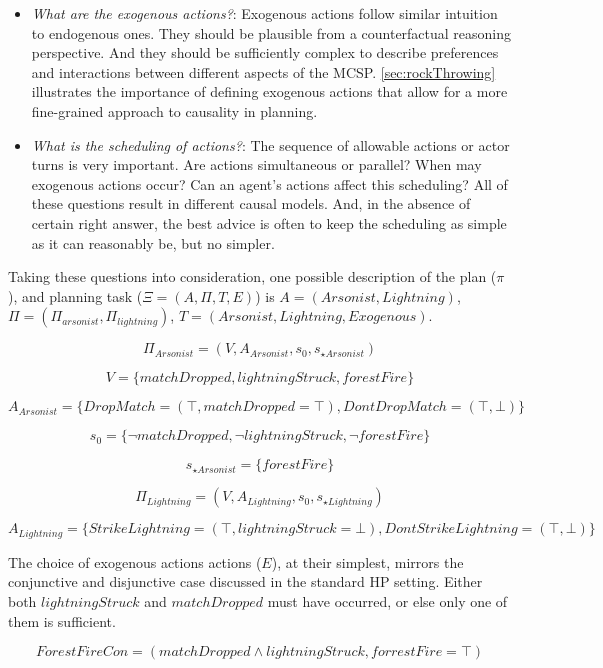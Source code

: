\documentclass{article}
\theoremstyle{plain}
\theoremstyle{definition}
\begin{document}
\begin{itemize}
\item \textit{What are the exogenous actions?}: Exogenous actions follow similar intuition to endogenous ones. They should be plausible from a counterfactual reasoning perspective. And they should be sufficiently complex to describe preferences and interactions between different aspects of the MCSP. \ref{sec:rockThrowing} illustrates the importance of defining exogenous actions that allow for a more fine-grained approach to causality in planning.

\item \textit{What is the scheduling of actions?}: The sequence of allowable actions or actor turns is very important. Are actions simultaneous or parallel? When may exogenous actions occur? Can an agent's actions affect this scheduling? All of these questions result in different causal models. And, in the absence of certain right answer, the best advice is often to keep the scheduling as simple as it can reasonably be, but no simpler.

\end{itemize}

Taking these questions into consideration, one possible description of the plan ($\pi$), and planning task ($\Xi = (A, \Pi, T, E)$) is $A=(Arsonist, Lightning)$, $\Pi=(\Pi_{arsonist}, \Pi_{lightning})$, $T=(Arsonist, Lightning, Exogenous)$.

\[
\Pi_{Arsonist} = (V, A_{Arsonist}, s_0, s_{\star Arsonist})
\]

\[
V = \{matchDropped, lightningStruck, forestFire\}
\]

\[
A_{Arsonist} = \{ DropMatch = (\top, matchDropped = \top), DontDropMatch = (\top, \bot) \}
\]

\[
s_0 = \{\lnot matchDropped, \lnot lightningStruck, \lnot forestFire \}
\]

\[
s_{\star Arsonist} = \{ forestFire \}
\]

\[
\Pi_{Lightning} = (V, A_{Lightning}, s_0, s_{\star Lightning})
\]

\[
A_{Lightning}=\{ StrikeLightning = (\top, lightningStruck=\bot), DontStrikeLightning = (\top, \bot) \}
\]

The choice of exogenous actions actions ($E$), at their simplest, mirrors the conjunctive and disjunctive case discussed in the standard HP setting. Either both $lightningStruck$ and $matchDropped$ must have occurred, or else only one of them is sufficient.

\[
ForestFireCon = ( matchDropped \land lightningStruck, forrestFire = \top )
\]
\end{document}

